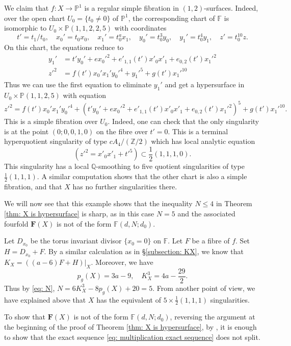 \documentclass[a4paper,11pt]{amsart}
\newcommand{\FF}{\ensuremath{\mathbb{F}}}
\newcommand{\PP}{\ensuremath{\mathbb{P}}}
\theoremstyle{definition}
\theoremstyle{remark}
\numberwithin{equation}{section}
\begin{document}
We claim that $f\colon X \to \PP^1$ is a regular simple fibration in $(1,2)$-surfaces. Indeed, over the open chart $U_0 = \{t_0 \ne 0\}$ of $\PP^1$, the corresponding chart of $\mathbb{F}$ is isomorphic to $U_0\times\mathbb{P}(1,1,2,2,5)$ with coordinates 
\[t'=t_1/t_0,\quad x_0'=t_0x_0,\quad x_1'=t_0^ax_1,\quad y_0'=t_0^3y_0,\quad y_1'=t_0^4y_1,\quad z'=t_0^{10}z.\] 
On this chart, the equations reduce to
\begin{align*}
    y_1' & = t'y_0' + ex_0'^2+e'_{1,1}(t')x'_0x'_1+e_{0,2}(t')x_1'^2 \\
    z'^2 &= f(t')x_0'x_1'y_0'^4+y_1'^5+g(t')x_1'^{10}
\end{align*}
Thus we can use the first equation to eliminate $y_1'$ and get a hypersurface in $U_0\times\PP(1,1,2,5)$ with equation
\[
z'^2=f(t')x_0'x_1'y_0'^4+(t'y_0'+ ex_0'^2+e'_{1,1}(t')x'_0x'_1+e_{0,2}(t')x_1'^2)^5 + g(t')x_1'^{10}.
\]
This is a simple fibration over $U_0$. Indeed, one can check that the only singularity is at the point $(0;0,0,1,0)$ on the fibre over $t'=0$. This is a terminal hyperquotient singularity of type $cA_4/(\mathbb{Z}/2)$ which has local analytic equation
\[(z'^2=x'_0x'_1+t'^5)\subset\frac12(1,1,1,0).\]
This singularity has a local $\mathbb{Q}$-smoothing to five quotient singularities of type $\frac12(1,1,1)$. A similar computation shows that the other chart is also a simple fibration, and that $X$ has no further singularities there.

We will now see that this example shows that the inequality $N\le 4$ in Theorem \ref{thm: X is hypersurface} is sharp, as in this case $N=5$ and the associated fourfold $\mathbf{F}(X)$ is not of the form $\FF(d, N; d_0)$.

Let $D_{x_0}$ be the torus invariant divisor $\{x_0 = 0\}$ on $\FF$. Let $F$ be a fibre of $f$. Set $H = D_{x_0} + F$. By a similar calculation as in \S \ref{subsection: KX}, we know that $K_X = \left((a - 6)F + H\right)|_X$. Moreover, we have
$$
p_g(X) = 3a-9, \quad K_X^3=4a - \frac{29}2.
$$
Thus by \eqref{eq: N}, $N = 6K_X^3 - 8p_g(X) + 20 = 5$.
From another point of view, we have explained above that $X$ has the equivalent of $5\times\frac12(1,1,1)$ singularities.

To show that $\mathbf{F}(X)$ is not of the form $\FF(d, N; d_0)$, reversing the argument at the beginning of the proof of Theorem \ref{thm: X is hypersurface}, by \cite[Example 3.16]{CP}, it is enough to show that the exact sequence \eqref{eq: multiplication exact sequence} does not split.
\end{document}
